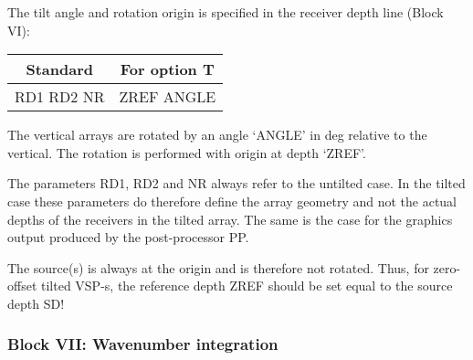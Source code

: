 The tilt angle and rotation origin is specified in the receiver depth
line (Block VI):

\begin{tabular}{cc}
   Standard   &    For option T \\ \hline
RD1 RD2 NR &  ZREF  ANGLE
\end{tabular}


The vertical arrays are rotated by an angle `ANGLE' in deg relative
to the vertical. The rotation is performed with origin at depth `ZREF'.

The parameters RD1, RD2 and NR always refer to the untilted case. 
In the tilted case these parameters do therefore define the array
geometry and not the actual depths of the receivers in the tilted array.
The same is the case for the graphics output produced by the
post-processor PP. 


The source(s) is always at the origin and is therefore not rotated.
Thus, for zero-offset tilted VSP-s, the reference depth ZREF should be set 
equal to the source depth SD!



\subsubsection{Block VII: Wavenumber integration}

